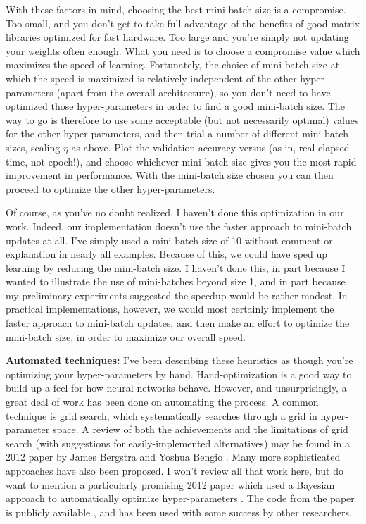 With these factors in mind, choosing the best mini-batch size is a compromise. Too small, and you don't get to take full advantage of the benefits of good matrix libraries optimized for fast hardware. Too large and you're simply not updating your weights often enough. What you need is to choose a compromise value which maximizes the speed of learning. Fortunately, the choice of mini-batch size at which the speed is maximized is relatively independent of the other hyper-parameters (apart from the overall architecture), so you don't need to have optimized those hyper-parameters in order to find a good mini-batch size. The way to go is therefore to use some acceptable (but not necessarily optimal) values for the other hyper-parameters, and then trial a number of different mini-batch sizes, scaling $\eta$ as above. Plot the validation accuracy versus \textit{} (as in, real elapsed time, not epoch!), and choose whichever mini-batch size gives you the most rapid improvement in performance. With the mini-batch size chosen you can then proceed to optimize the other hyper-parameters.

Of course, as you've no doubt realized, I haven't done this optimization in our work. Indeed, our implementation doesn't use the faster approach to mini-batch updates at all. I've simply used a mini-batch size of 10 without comment or explanation in nearly all examples. Because of this, we could have sped up learning by reducing the mini-batch size. I haven't done this, in part because I wanted to illustrate the use of mini-batches beyond size 1, and in part because my preliminary experiments suggested the speedup would be rather modest. In practical implementations, however, we would most certainly implement the faster approach to mini-batch updates, and then make an effort to optimize the mini-batch size, in order to maximize our overall speed.

\textbf{Automated techniques:} I've been describing these heuristics as though you're optimizing your hyper-parameters by hand. Hand-optimization is a good way to build up a feel for how neural networks behave. However, and unsurprisingly, a great deal of work has been done on automating the process. A common technique is grid search, which systematically searches through a grid in hyper-parameter space. A review of both the achievements and the limitations of grid search (with suggestions for easily-implemented alternatives) may be found in a 2012 paper by James Bergstra and Yoshua Bengio \cite{Bergstra2012}. Many more sophisticated approaches have also been proposed. I won't review all that work here, but do want to mention a particularly promising 2012 paper which used a Bayesian approach to automatically optimize hyper-parameters \cite{Snoek2012}. The code from the paper is publicly available \cite{Snoek2012b}, and has been used with some success by other researchers.

